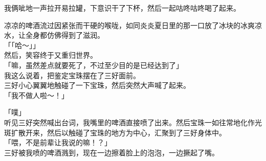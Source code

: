 我俩呲地一声拉开易拉罐，下意识干了下杯，然后一起咕咚咕咚喝了起来。

凉凉的啤酒流过因紧张而干硬的喉咙，如同炎炎夏日里的那一口放了冰块的冰爽凉水，让全身都仿佛得到了滋润。\\

「「哈～」」\\

然后，笑容终于又重归世界。\\

「嘛，虽然差点就要死了，不过至少目的是已经达到了」\\

我这么说着，把鉴定宝珠摆在了三好面前。\\

三好小心翼翼地触碰了一下宝珠，然后突然大声喊了起来。\\

「我不做人啦～！」

「噗」\\

听见三好突然喊出台词，我嘴里的啤酒直接喷了出来。然后宝珠一如往常地化作光斑扩散开来，然后以触碰了宝珠的地方为中心，汇聚到了三好身体中。\\

「喂，不是前辈让我说的嘛！？」\\

三好被我喷的啤酒溅到，现在一边擦着脸上的泡泡，一边撅起了嘴。\\

